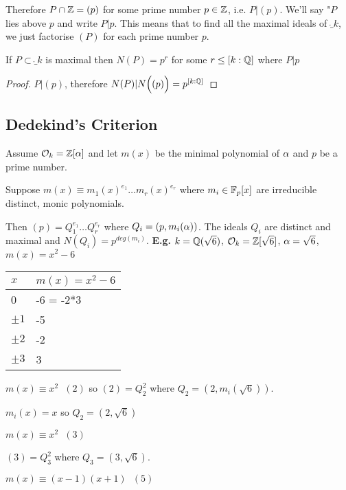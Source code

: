 \documentclass[11pt]{article}
\begin{document}
Therefore $P \cap \mathbb{Z} = (p)$ for some prime number $p \in \mathbb{Z}$, i.e. $P | (p)$. We'll say "$P$ lies above $p$ and write $P|p$.
\spac
This means that to find all the maximal ideals of $\ring_k$, we just factorise $(P)$ for each prime number $p$.

\begin{cor}
	If $P \subset \ring_k$ is maximal then $N(P) = p^r$ for some $r \leq [k:\mathbb{Q}]$ where $P|p$ 
\end{cor}
\begin{proof}
	$P|(p)$, therefore $N(P) |N\Big((p)\Big) = p^{[k:\mathbb{Q}]}$
\end{proof}


\subsection{Dedekind's Criterion}

Assume $\mathcal{O}_k =\mathbb{Z}[\alpha]$ and let $m(x)$ be the minimal polynomial of $\alpha$ and $p$ be a prime number.

Suppose $m(x) \equiv m_1(x)^{e_1} \dots m_r(x)^{e_r}$ where $m_i \in \mathbb{F}_p[x]$ are irreducible distinct, monic polynomials.

Then $(p) = Q_1^{e_1} \dots Q_r^{e_r}$ where $Q_i = (p, m_i(\alpha))$. The ideals $Q_i$ are distinct and maximal and $N(Q_i) = p^{deg(m_i)}$.
\spac
\textbf{E.g.} $k = \mathbb{Q}(\sqrt{6})$, $\mathcal{O}_k = \mathbb{Z}[\sqrt6]$, $\alpha = \sqrt6 $, $m(x) = x^2 -6$

\spac
	\begin{tabular}{l|l}
		$x$                    & $m(x) = x^2 - 6$ \\ \hline
		0                    & -6 = -2*3       \\
		$\pm 1$              & -5              \\
		$\pm 2$ & -2                           \\
		$\pm 3$ & 3                              
	\end{tabular}
\spac

$m(x) \equiv x^2 \hspace{7pt} (2)$ so $(2) = Q_2^2$ where $Q_2 = (2, m_i(\sqrt6))$.

$m_i(x) = x$ so $Q_2= (2, \sqrt6)$
\spac

$m(x) \equiv x^2 \hspace{7pt} (3)$ 

$(3) = Q_3^2 $ where $Q_3 = (3, \sqrt{6})$.
\spac

$m(x) \equiv (x-1)(x+1) \hspace{7pt} (5) $ 
\end{document}
